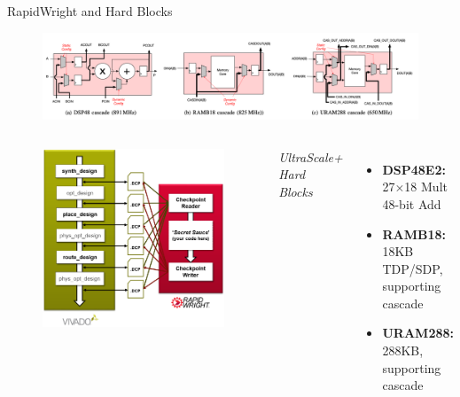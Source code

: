 \documentclass[10pt]{beamer}
\begin{document}
\begin{frame}{RapidWright and Hard Blocks}

\begin{figure}
  \includegraphics[width=1.0\textwidth]{img/hardblocks.png}
  \vspace{-0.3cm}
\end{figure}

\begin{columns}[T, onlytextwidth]
    \begin{figure}
      \includegraphics[width=\textwidth]{img/vivado_dcps.png}
    \end{figure}


    {\fontsize{7}{10}
    \emph{UltraScale+ Hard Blocks}
    \begin{itemize}
      \item {\bf DSP48E2:} 27$\times$18 Mult 48-bit Add
      \item {\bf RAMB18:} 18KB TDP/SDP, supporting \alert{cascade}
      \item {\bf URAM288:} 288KB, supporting \alert{cascade}
    \end{itemize}

}
\end{columns}
\end{frame}
\end{document}
